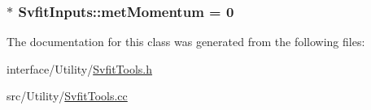 \label{classSvfitInputs_ae09cccb51b5186fd72eb03eae338f131}
\hypertarget{classSvfitInputs_ace5d904fc75fdff3f820bfc9d67fb87c}{
\subsubsection[{metMomentum}]{$\ast$ {\bf SvfitInputs::metMomentum} = 0}}
\label{classSvfitInputs_ace5d904fc75fdff3f820bfc9d67fb87c}


The documentation for this class was generated from the following files:\begin{DoxyCompactItemize}
\item 
interface/Utility/\hyperlink{SvfitTools_8h}{SvfitTools.h}\item 
src/Utility/\hyperlink{SvfitTools_8cc}{SvfitTools.cc}\end{DoxyCompactItemize}
